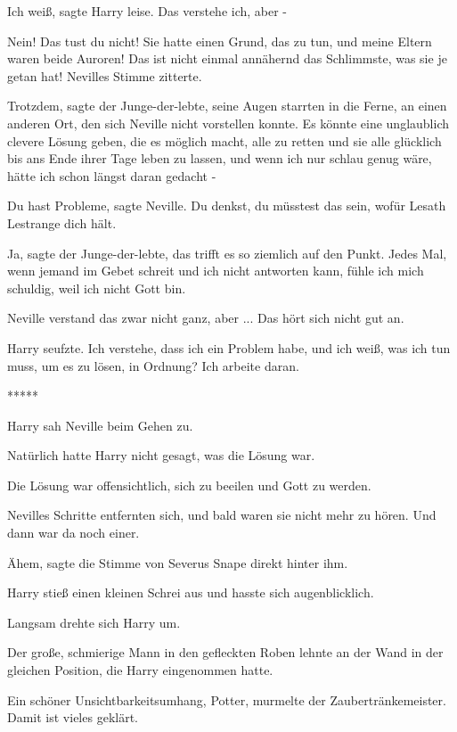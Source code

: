 \glqq{}Ich weiß\grqq{}, sagte Harry leise. \glqq{}Das verstehe ich, aber
-\grqq{}

\glqq{}Nein! Das tust du nicht! Sie hatte einen Grund, das zu tun, und meine
Eltern waren beide Auroren! Das ist nicht einmal annähernd das Schlimmste, was
sie je getan hat!\grqq{} Nevilles Stimme zitterte.

\glqq{}Trotzdem\grqq{}, sagte der Junge-der-lebte, seine Augen starrten in die
Ferne, an einen anderen Ort, den sich Neville nicht vorstellen konnte. \glqq{}Es
könnte eine unglaublich clevere Lösung geben, die es möglich macht, alle zu
retten und sie alle glücklich bis ans Ende ihrer Tage leben zu lassen, und wenn
ich nur schlau genug wäre, hätte ich schon längst daran gedacht -\grqq{}

\glqq{}Du hast Probleme\grqq{}, sagte Neville. \glqq{}Du denkst, du müsstest das
sein, wofür Lesath Lestrange dich hält.\grqq{}

\glqq{}Ja\grqq{}, sagte der Junge-der-lebte, \glqq{}das trifft es so ziemlich
auf den Punkt. Jedes Mal, wenn jemand im Gebet schreit und ich nicht antworten
kann, fühle ich mich schuldig, weil ich nicht Gott bin.\grqq{}

Neville verstand das zwar nicht ganz, aber ... \glqq{}Das hört sich nicht gut
an.\grqq{}

Harry seufzte. \glqq{}Ich verstehe, dass ich ein Problem habe, und ich weiß, was
ich tun muss, um es zu lösen, in Ordnung? Ich arbeite daran.\grqq{}

\begin{center}*****\end{center}

Harry sah Neville beim Gehen zu.

Natürlich hatte Harry nicht gesagt, was die Lösung war.

Die Lösung war offensichtlich, sich zu beeilen und Gott zu werden.

Nevilles Schritte entfernten sich, und bald waren sie nicht mehr zu hören. Und
dann war da noch einer.

\glqq{}Ähem\grqq{}, sagte die Stimme von Severus Snape direkt hinter ihm.

Harry stieß einen kleinen Schrei aus und hasste sich augenblicklich.

Langsam drehte sich Harry um.

Der große, schmierige Mann in den gefleckten Roben lehnte an der Wand in der
gleichen Position, die Harry eingenommen hatte.

\glqq{}Ein schöner Unsichtbarkeitsumhang, Potter\grqq{}, murmelte der
Zaubertränkemeister. \glqq{}Damit ist vieles geklärt.\grqq{}

